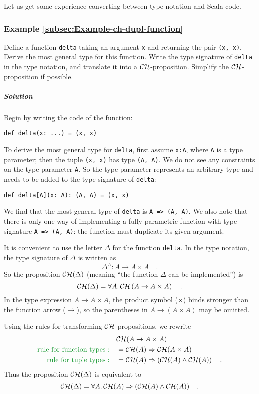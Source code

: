 Let us get some experience converting between type notation and Scala
code.

\subsubsection{Example \label{subsec:Example-ch-dupl-function}\ref{subsec:Example-ch-dupl-function}}

Define a function \lstinline!delta! taking an argument \lstinline!x!
and returning the pair \lstinline!(x, x)!. Derive the most general
type for this function. Write the type signature of \lstinline!delta!
in the type notation, and translate it into a ${\cal CH}$-proposition.
Simplify the ${\cal CH}$-proposition if possible.

\subparagraph{Solution}

Begin by writing the code of the function:
\begin{lstlisting}
def delta(x: ...) = (x, x)
\end{lstlisting}
To derive the most general type for \lstinline!delta!, first assume
\lstinline!x:A!, where \lstinline!A! is a type parameter; then the
tuple \lstinline!(x, x)! has type \lstinline!(A, A)!. We do not
see any constraints on the type parameter \lstinline!A!. So the type
parameter represents an arbitrary type and needs to be added to the
type signature of \lstinline!delta!:
\begin{lstlisting}
def delta[A](x: A): (A, A) = (x, x)
\end{lstlisting}
We find that the most general type of \lstinline!delta! is \lstinline!A => (A, A)!.
We also note that there is only one way of implementing a fully parametric
function with type signature \lstinline!A => (A, A)!: the function
must duplicate its given argument.

It is convenient to use the letter $\Delta$ for the function \lstinline!delta!.
In the type notation, the type signature of $\Delta$ is written as
\[
\Delta^{A}:A\rightarrow A\times A\quad.
\]
So the proposition ${\cal CH}(\Delta)$ (meaning ``the function $\Delta$
can be implemented'') is
\[
{\cal CH}(\Delta)=\forall A.{\cal \,CH}\left(A\rightarrow A\times A\right)\quad.
\]
In the type expression $A\rightarrow A\times A$, the product symbol
($\times$) binds stronger than the function arrow ($\rightarrow$),
so the parentheses in $A\rightarrow\left(A\times A\right)$ may be
omitted.

Using the rules for transforming ${\cal CH}$-propositions, we rewrite
\begin{align*}
 & {\cal CH}(A\rightarrow A\times A)\\
{\color{greenunder}\text{rule for function types}:}\quad & ={\cal CH}(A)\Rightarrow{\cal CH}(A\times A)\\
{\color{greenunder}\text{rule for tuple types}:}\quad & ={\cal CH}(A)\Rightarrow\left({\cal CH}(A)\wedge{\cal CH}(A)\right)\quad.
\end{align*}
Thus the proposition ${\cal CH}(\Delta)$ is equivalent to
\[
{\cal CH}(\Delta)=\forall A.\,{\cal CH}(A)\Rightarrow({\cal CH}(A)\wedge{\cal CH}(A))\quad.
\]


